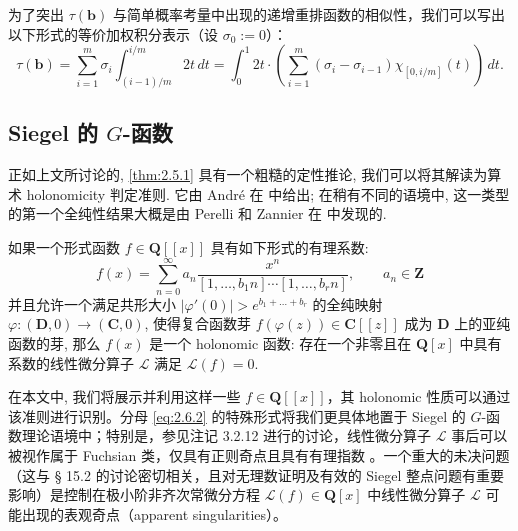 为了突出 \(\tau(\mathbf{b})\) 与简单概率考量中出现的递增重排函数的相似性，我们可以写出以下形式的等价加权积分表示（设 \(\sigma_0 := 0\)）：
\begin{equation}\label{eq:2.5.6}
\tau(\mathbf{b}) = \sum_{i=1}^{m} \sigma_i \int_{(i-1)/m}^{i/m} 2t \, dt = \int_0^1 2t \cdot \left( \sum_{i=1}^{m} (\sigma_i - \sigma_{i-1}) \chi_{[0,i/m]}(t) \right) \, dt.
\end{equation}

\subsection{Siegel 的 $G$-函数}\label{sec:2.6}

正如上文所讨论的, \autoref{thm:2.5.1} 具有一个粗糙的定性推论, 我们可以将其解读为算术 holonomicity 判定准则. 它由 Andr{\'e} 在 \cite{And89} 中给出; 在稍有不同的语境中, 这一类型的第一个全纯性结果大概是由 Perelli 和 Zannier 在 \cite{PZ84} 中发现的.

\begin{corollary}\label{cor:2.6.1}
如果一个形式函数 \(f \in \mathbf{Q}[\! [x]\!]\) 具有如下形式的有理系数:
\begin{equation}\label{eq:2.6.2}
  f(x) = \sum_{n=0}^{\infty} a_n \frac{x^n}{[1, \dots, b_1 n] \cdots [1, \dots, b_r n]}, \qquad a_n \in \mathbf{Z}
\end{equation}
并且允许一个满足共形大小 \(\lvert\varphi'(0)\rvert > e^{b_1 + \dots + b_r}\) 的全纯映射 \(\varphi: (\mathbf{D}, 0) \to (\mathbf{C}, 0)\), 使得复合函数芽 \(f(\varphi(z)) \in \mathbf{C}[\![z]\!]\) 成为 \(\mathbf{D}\) 上的亚纯函数的芽, 
那么 \(f(x)\) 是一个 holonomic 函数: 存在一个非零且在 \(\mathbf{Q}[x]\) 中具有系数的线性微分算子 \(\mathcal{L}\) 满足 \(\mathcal{L}(f) = 0\).
\end{corollary}

在本文中, 我们将展示并利用这样一些 $f \in \mathbf{Q}[\![x]\!]$，其 holonomic 性质可以通过该准则进行识别。分母 \eqref{eq:2.6.2} 的特殊形式将我们更具体地置于 Siegel 的 $G$-函数理论语境中；特别是，参见注记 3.2.12 进行的讨论，线性微分算子 $\mathcal{L}$ 事后可以被视作属于 Fuchsian 类，仅具有正则奇点且具有有理指数 \cite[III 6.1, VII 2.1, 和 VIII 1.5]{DGS94}。一个重大的未决问题（这与 § 15.2 的讨论密切相关，且对无理数证明及有效的 Siegel 整点问题有重要影响）是控制在极小阶非齐次常微分方程 $\mathcal{L}(f) \in \mathbf{Q}[x]$ 中线性微分算子 $\mathcal{L}$ 可能出现的表观奇点（apparent singularities）。

